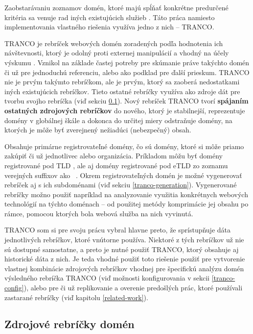 Zaobstarávaniu zoznamov domén, ktoré majú spĺňať konkrétne predurčené kritéria sa venuje rad iných existujúcich služieb 
\cite{hacker-target-website-lists-overview, tranco}. Táto práca namiesto implementovania vlastného riešenia využíva jedno z nich -- TRANCO.

TRANCO je rebríček webových domén zoradených podľa hodnotenia ich návštevnosti, ktorý je odolný proti externej manipulácií a vhodný na účely výskumu \cite{tranco-homepage}. 
Vznikol na základe častej potreby pre skúmanie práve takýchto domén či už pre jednoduchú referenciu, alebo ako podklad pre ďalší prieskum.
TRANCO nie je prvým takýmto rebríčkom, ale je prvým, ktorý sa zaoberá nedostatkami iných existujúcich rebríčkov.
Tieto ostatné rebríčky využíva ako zdroje dát pre tvorbu svojho rebríčka (viď sekciu \ref{tranco-source-rankings}).
Nový rebríček TRANCO tvorí \textbf{spájaním ostatných zdrojových rebríčkov} do nového, 
ktorý je stabilnejší, reprezentuje domény v globálnej škále a dokonca do určitej miery odstraňuje domény, na ktorých je môže byť zverejnený nežiadúci (nebezpečný) obsah\cite{tranco}. 

Obsahuje primárne registrovateľné domény, čo sú domény, ktoré si môže priamo zakúpiť či už jednotlivec alebo organizácia. 
Príkladom môžu byť domény registrované pod TLD , ale aj domény registrované pod eTLD zo zoznamu verejných suffixov ako \mbox{ \cite{tranco}}. 
Okrem registrovateľných domén je možné vygenerovať rebríček aj s ich subdoménami (viď sekciu \ref{tranco-generation}).
Vygenerované rebríčky možno použiť napríklad na analyzovanie využitia konkrétnych webových technológií na týchto doménach -- od použitej metódy komprimácie jej obsahu po rámce, pomocou ktorých bola webová služba na nich vyvinutá.

TRANCO som si pre svoju prácu vybral hlavne preto, že sprístupňuje dáta jednotlivých rebríčkov, ktoré vnútorne používa. 
Niektoré z tých rebríčkov už nie sú dostupné samostatne, a preto je nutné použiť TRANCO, ktorý obsahuje aj historické dáta z nich. 
Je teda vhodné použiť toto riešenie použiť pre vytvorenie vlastnej kombinácie zdrojových rebríčkov vhodnej pre špecifickú analýzu domén výsledného rebríčka TRANCO (viď možnosti konfigurovania v sekcii \ref{tranco-config}), alebo pre či už replikovanie a overenie predošlých prác, ktoré používali zastarané rebríčky (viď kapitolu \ref{related-work}).

\pagebreak


\subsection{Zdrojové rebríčky domén}
\label{tranco-source-rankings}

